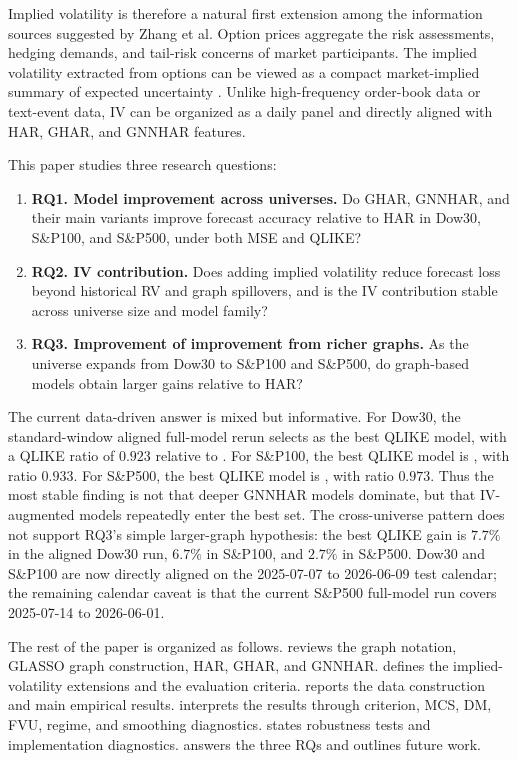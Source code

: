 \documentclass[11pt,a4paper]{article}
\newcommand{\model}[1]{\texttt{\detokenize{#1}}}
\newcommand{\dow}{Dow30}
\newcommand{\spone}{S\&P100}
\newcommand{\spfive}{S\&P500}
\begin{document}
Implied volatility is therefore a natural first extension among the information sources suggested by Zhang et al.  Option prices aggregate the risk assessments, hedging demands, and tail-risk concerns of market participants.  The implied volatility extracted from options can be viewed as a compact market-implied summary of expected uncertainty \citep{busch2011iv,kambouroudis2021hariv,yfanti2021aimheavy,yao2018modelfreeiv}.  Unlike high-frequency order-book data or text-event data, IV can be organized as a daily panel and directly aligned with HAR, GHAR, and GNNHAR features.

This paper studies three research questions:
\begin{enumerate}
  \item \textbf{RQ1. Model improvement across universes.} Do GHAR, GNNHAR, and their main variants improve forecast accuracy relative to HAR in \dow{}, \spone{}, and \spfive{}, under both MSE and QLIKE?
  \item \textbf{RQ2. IV contribution.} Does adding implied volatility reduce forecast loss beyond historical RV and graph spillovers, and is the IV contribution stable across universe size and model family?
  \item \textbf{RQ3. Improvement of improvement from richer graphs.} As the universe expands from \dow{} to \spone{} and \spfive{}, do graph-based models obtain larger gains relative to HAR?
\end{enumerate}

The current data-driven answer is mixed but informative.  For \dow{}, the standard-window aligned full-model rerun selects \model{GNNHAR2L_Q_IV} as the best QLIKE model, with a QLIKE ratio of \(0.923\) relative to \model{HAR_M}.  For \spone{}, the best QLIKE model is \model{HAR_Q_IV}, with ratio \(0.933\).  For \spfive{}, the best QLIKE model is \model{GHAR_M_IV}, with ratio \(0.973\).  Thus the most stable finding is not that deeper GNNHAR models dominate, but that IV-augmented models repeatedly enter the best set.  The cross-universe pattern does not support RQ3's simple larger-graph hypothesis: the best QLIKE gain is \(7.7\%\) in the aligned \dow{} run, \(6.7\%\) in \spone{}, and \(2.7\%\) in \spfive{}.  Dow30 and S\&P100 are now directly aligned on the 2025-07-07 to 2026-06-09 test calendar; the remaining calendar caveat is that the current S\&P500 full-model run covers 2025-07-14 to 2026-06-01.

The rest of the paper is organized as follows.   reviews the graph notation, GLASSO graph construction, HAR, GHAR, and GNNHAR.   defines the implied-volatility extensions and the evaluation criteria.   reports the data construction and main empirical results.   interprets the results through criterion, MCS, DM, FVU, regime, and smoothing diagnostics.   states robustness tests and implementation diagnostics.   answers the three RQs and outlines future work.
\end{document}
